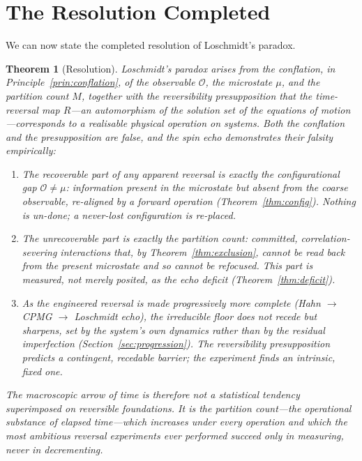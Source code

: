 \documentclass[11pt,a4paper]{article}
\theoremstyle{thmstyle}
\newtheorem{theorem}{Theorem}[section]
\theoremstyle{definition}
\theoremstyle{remark}
\newcommand{\Obs}{\mathcal{O}}
\newcommand{\Mic}{\mu}
\newcommand{\Count}{M}
\begin{document}
\section{The Resolution Completed}
\label{sec:resolution}

We can now state the completed resolution of Loschmidt's paradox.

\begin{theorem}[Resolution]
\label{thm:resolution}
Loschmidt's paradox arises from the conflation, in
Principle~\ref{prin:conflation}, of the observable $\Obs$, the microstate
$\Mic$, and the partition count $\Count$, together with the
reversibility presupposition that the time-reversal map $R$---an
automorphism of the solution set of the equations of
motion---corresponds to a realisable physical operation on systems. Both
the conflation and the presupposition are false, and the spin echo
demonstrates their falsity empirically:
\begin{enumerate}[leftmargin=1.6em,label=(\roman*),itemsep=0.2em]
\item The recoverable part of any apparent reversal is exactly the
configurational gap $\Obs\neq\Mic$: information present in the microstate
but absent from the coarse observable, re-aligned by a forward operation
(Theorem~\ref{thm:config}). Nothing is un-done; a never-lost
configuration is re-placed.
\item The unrecoverable part is exactly the partition count: committed,
correlation-severing interactions that, by
Theorem~\ref{thm:exclusion}, cannot be read back from the present
microstate and so cannot be refocused. This part is measured, not merely
posited, as the echo deficit (Theorem~\ref{thm:deficit}).
\item As the engineered reversal is made progressively more complete
(Hahn $\to$ CPMG $\to$ Loschmidt echo), the irreducible floor does not
recede but sharpens, set by the system's own dynamics rather than by the
residual imperfection (Section~\ref{sec:progression}). The reversibility
presupposition predicts a contingent, recedable barrier; the experiment
finds an intrinsic, fixed one.
\end{enumerate}
The macroscopic arrow of time is therefore not a statistical tendency
superimposed on reversible foundations. It is the partition count---the
operational substance of elapsed time---which increases under every
operation and which the most ambitious reversal experiments ever
performed succeed only in measuring, never in decrementing.
\end{theorem}
\end{document}
